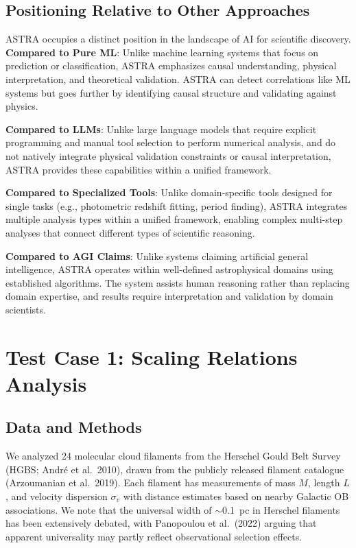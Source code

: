 \documentclass[usenatbib]{rasti}
\begin{document}
\subsection{Positioning Relative to Other Approaches}

ASTRA occupies a distinct position in the landscape of AI for scientific discovery. \textbf{Compared to Pure ML}: Unlike machine learning systems that focus on prediction or classification, ASTRA emphasizes causal understanding, physical interpretation, and theoretical validation. ASTRA can detect correlations like ML systems but goes further by identifying causal structure and validating against physics.

\textbf{Compared to LLMs}: Unlike large language models that require explicit programming and manual tool selection to perform numerical analysis, and do not natively integrate physical validation constraints or causal interpretation, ASTRA provides these capabilities within a unified framework.

\textbf{Compared to Specialized Tools}: Unlike domain-specific tools designed for single tasks (e.g., photometric redshift fitting, period finding), ASTRA integrates multiple analysis types within a unified framework, enabling complex multi-step analyses that connect different types of scientific reasoning.

\textbf{Compared to AGI Claims}: Unlike systems claiming artificial general intelligence, ASTRA operates within well-defined astrophysical domains using established algorithms. The system assists human reasoning rather than replacing domain expertise, and results require interpretation and validation by domain scientists.

\section{Test Case 1: Scaling Relations Analysis}

\subsection{Data and Methods}

We analyzed 24 molecular cloud filaments from the Herschel Gould Belt Survey (HGBS; André et al.~2010)\cite{andre2010}, drawn from the publicly released filament catalogue (Arzoumanian et al.~2019)\cite{arzoumanian2019}. Each filament has measurements of mass $M$, length $L$, and velocity dispersion $\sigma_v$ with distance estimates based on nearby Galactic OB associations. We note that the universal width of $\sim$0.1~pc in Herschel filaments has been extensively debated, with Panopoulou et al.~(2022)\cite{panopoulou2022} arguing that apparent universality may partly reflect observational selection effects.
\end{document}

